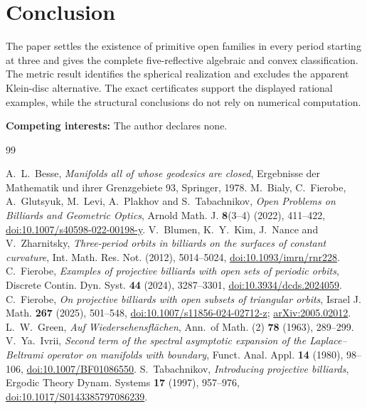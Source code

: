 \documentclass[11pt,a4paper]{article}
\theoremstyle{plain}
\theoremstyle{definition}
\theoremstyle{remark}
\begin{document}
\section*{Conclusion}
The paper settles the existence of primitive open families in every period
starting at three and gives the complete five-reflective algebraic and convex
classification.  The metric result identifies the spherical realization and
excludes the apparent Klein-disc alternative.  The exact certificates support
the displayed rational examples, while the structural conclusions do not rely
on numerical computation.
\par\medskip
\noindent\textbf{Competing interests:} The author declares none.
\par\medskip
\begin{thebibliography}{99}
\raggedright
{} A.~L.~Besse, \emph{Manifolds all of whose geodesics are closed},
Ergebnisse der Mathematik und ihrer Grenzgebiete 93, Springer, 1978.
 M.~Bialy, C.~Fierobe, A.~Glutsyuk, M.~Levi, A.~Plakhov and
S.~Tabachnikov, \emph{Open Problems on Billiards and Geometric Optics},
 Arnold Math. J. \textbf{8}(3--4) (2022), 411--422,
\href{https://doi.org/10.1007/s40598-022-00198-y}{doi:10.1007/s40598-022-00198-y}.
 V.~Blumen, K.~Y.~Kim, J.~Nance and V.~Zharnitsky,
\emph{Three-period orbits in billiards on the surfaces of constant curvature},
Int. Math. Res. Not. (2012), 5014--5024,
\href{https://doi.org/10.1093/imrn/rnr228}{doi:10.1093/imrn/rnr228}.
 C.~Fierobe, \emph{Examples of projective billiards with open
sets of periodic orbits}, Discrete Contin. Dyn. Syst. \textbf{44} (2024),
3287--3301, \href{https://doi.org/10.3934/dcds.2024059}{doi:10.3934/dcds.2024059}.
 C.~Fierobe, \emph{On projective billiards with open subsets
of triangular orbits}, Israel J. Math. \textbf{267} (2025), 501--548,
\href{https://doi.org/10.1007/s11856-024-02712-z}{doi:10.1007/s11856-024-02712-z};
\href{https://arxiv.org/abs/2005.02012}{arXiv:2005.02012}.
 L.~W.~Green, \emph{Auf Wiedersehensfl\"achen},
Ann.~of Math. (2) \textbf{78} (1963), 289--299.
 V.~Ya.~Ivrii, \emph{Second term of the spectral asymptotic
expansion of the Laplace--Beltrami operator on manifolds with boundary},
Funct. Anal. Appl. \textbf{14} (1980), 98--106,
\href{https://doi.org/10.1007/BF01086550}{doi:10.1007/BF01086550}.
 S.~Tabachnikov, \emph{Introducing projective billiards},
Ergodic Theory Dynam. Systems \textbf{17} (1997), 957--976,
\href{https://doi.org/10.1017/S0143385797086239}{doi:10.1017/S0143385797086239}.
\end{thebibliography}
\end{document}
